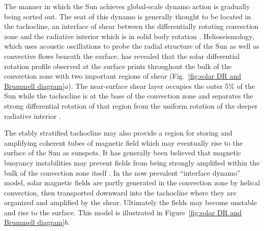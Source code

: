 The manner in which the Sun achieves global-scale dynamo action is
gradually being sorted out.  
The seat of this dynamo is generally thought to
be located in the tachocline, an interface of shear between the
differentially rotating convection zone and the radiative interior
which is in solid body rotation
\citep[e.g.,][]{Parker_1993,Charbonneau&MacGregor_1997,Ossendrijver_2003}. 
Helioseismology, which uses acoustic
oscillations to probe the radial structure of the Sun as well as
convective flows beneath the surface, has revealed that the solar
differential rotation profile observed at the surface prints
throughout the bulk of the convection zone with two important regions
of shear (Fig.~\ref{fig:solar DR and Brummell diagram}$a$).  
The near-surface shear layer occupies the outer 5\%
of the Sun while the tachocline is at the base of the convection zone
and separates the strong differential rotation of that region from the
uniform rotation of the deeper radiative interior
\citep[e.g.,][]{Thompson_et_al_2003, Thompson_2009}.


The stably stratified
tachocline may also provide a region for storing and amplifying
coherent tubes of magnetic field which may eventually rise to the
surface of the Sun as sunspots.  It has generally been believed that
magnetic buoyancy instabilities may prevent fields from being strongly
amplified within the bulk of the convection zone itself
\citep{Parker_1975}.  In the now prevalent ``interface dynamo'' model,
solar magnetic fields are partly generated in the convection zone by
helical convection, then transported downward into the tachocline
where they are organized and amplified by the shear.  Ultimately the
fields may become unstable and rise to the surface.  This model is
illustrated in Figure~\ref{fig:solar DR and Brummell diagram}$b$.

